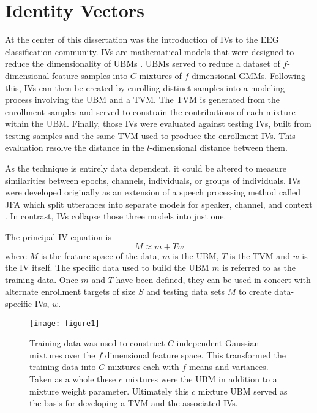 \section{Identity Vectors}

At the center of this dissertation was the introduction of \acp{IV} to the \ac{EEG} classification community. \acp{IV} are mathematical models that were designed to reduce the dimensionality of \acp{UBM} \cite{Kenny2008b}. \acp{UBM} served to reduce a dataset of $f$-dimensional feature samples into $C$ mixtures of $f$-dimensional \acp{GMM}. Following this, \acp{IV} can then be created by enrolling distinct samples into a modeling process involving the \ac{UBM} and a \ac{TVM}. The \ac{TVM} is generated from the enrollment samples and served to constrain the contributions of each mixture within the \ac{UBM}. Finally, those \acp{IV} were evaluated against testing \acp{IV}, built from testing samples and the same \ac{TVM} used to produce the enrollment \acp{IV}. This evaluation resolve the distance in the $l$-dimensional distance between them.

As the technique is entirely data dependent, it could be altered to measure similarities between epochs, channels, individuals, or groups of individuals. \acp{IV} were developed originally as an extension of a speech processing method called \ac{JFA} which split utterances into separate models for speaker, channel, and context \cite{Kenny2007b}. In contrast, \acp{IV} collapse those three models into just one.

The principal \ac{IV} equation is 
\begin{equation}
M\approx m+Tw
\label{eq-iVec_raw}
\end{equation}
where $M$ is the feature space of the data, $m$ is the \ac{UBM}, $T$ is the \ac{TVM} and $w$ is the \ac{IV} itself. The specific data used to build the \ac{UBM} $m$ is referred to as the training data. Once $m$ and $T$ have been defined, they can be used in concert with alternate enrollment targets of size $S$ and testing data sets $M$ to create data-specific \acp{IV}, $w$.

\begin{figure}[ht]
\centering
\texttt{[image: figure1]}
\caption[UBM Development]{Training data was used to construct $C$ independent Gaussian mixtures over the $f$ dimensional feature space. This transformed the training data into $C$ mixtures each with $f$ means and variances. Taken as a whole these $c$ mixtures were the \ac{UBM} in addition to a mixture weight parameter. Ultimately this $c$ mixture \ac{UBM} served as the basis for developing a \ac{TVM} and the associated \acp{IV}.}
\label{fig:ubm}
\end{figure}

